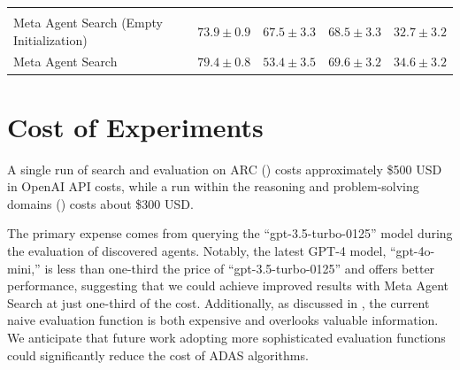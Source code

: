 \documentclass{article} %
\newcommand{\problemlong}{Automated Design of Agentic Systems\xspace}
\newcommand{\problem}{ADAS\xspace}
\newcommand{\ouralgo}{Meta Agent Search\xspace}
\begin{document}
\begin{table}[h]
{\begin{tabular}{>{\raggedright}p{6cm}cccc}
        \midrule
        \rowcolor{gray!20} \multicolumn{5}{>{\centering\arraybackslash}p{16.3cm}}{\textbf{\problemlong on Different Domains}} \vspace{0.1cm} \\
        Meta Agent Search (Empty Initialization) & \rule{0pt}{2.2ex}$73.9 \pm 0.9$ & $\mathbf{67.5 \pm 3.3}$ & $\mathbf{68.5 \pm 3.3}$ & $\mathbf{32.7 \pm 3.2}$ \\
        Meta Agent Search & \rule{0pt}{2.2ex}$\mathbf{79.4 \pm 0.8}$ & $53.4 \pm 3.5$ & $\mathbf{69.6 \pm 3.2}$ & $\mathbf{34.6 \pm 3.2}$ \\
        \bottomrule
    \end{tabular}}
    \label{tab:empty_init}
\end{table}

\section{Cost of Experiments}
\label{append_section:cost}

A single run of search and evaluation on ARC () costs approximately \$500 USD in OpenAI API costs, while a run within the reasoning and problem-solving domains () costs about \$300 USD.

The primary expense comes from querying the ``gpt-3.5-turbo-0125'' model during the evaluation of discovered agents.
Notably, the latest GPT-4 model, ``gpt-4o-mini,'' is less than one-third the price of ``gpt-3.5-turbo-0125'' and offers better performance, suggesting that we could achieve improved results with \ouralgo at just one-third of the cost. Additionally, as discussed in , the current naive evaluation function is both expensive and overlooks valuable information. We anticipate that future work adopting more sophisticated evaluation functions could significantly reduce the cost of \problem algorithms.

\end{document}
